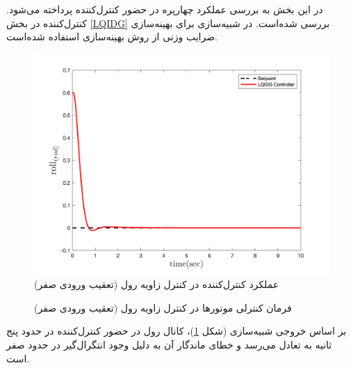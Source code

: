  در این بخش به بررسی عملکرد چهارپره در حضور کنترل‌کننده  پرداخته می‌شود. کنترل‌کننده  در بخش
\ref{LQIDG}
بررسی شده‌است.
 در شبیه‌سازی برای بهینه‌سازی ضرایب وزنی  از روش بهینه‌سازی
 \cite{Karimi2010}
استفاده شده‌است.
\begin{figure}[H]
	\includegraphics[width=.48\linewidth]{../Figures/MIL/LQIDG/Roll/lqidg_rollnn_.png}
	\centering
	\caption{عملكرد کنترل‌کننده  در کنترل زاويه رول (تعقیب ورودی صفر)}
	\label{lqidg_roll_fig_simulation}
\end{figure}
\begin{figure}[H]
	\centering
	\caption{‫‪فرمان کنترلی موتورها در کنترل زاویه رول (تعقیب ورودی صفر)}
\end{figure}

بر اساس خروجی شبیه‌سازی (شکل
\ref{lqidg_roll_fig_simulation})،
کانال رول در حضور کنترل‌کننده  در حدود پنج ثانیه به تعادل می‌رسد و خطای ماندگار آن به دلیل وجود انتگرال‌گیر در حدود صفر است.